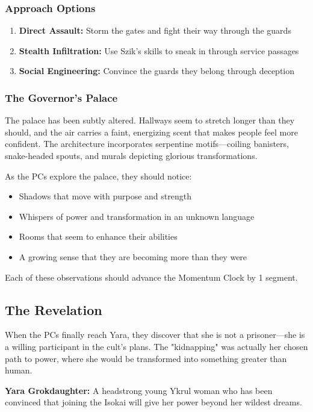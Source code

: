 \documentclass[12pt,twoside]{article}
\begin{document}
\subsubsection{Approach Options}

\begin{enumerate}
  \item \textbf{Direct Assault:} Storm the gates and fight their way through the guards
  \item \textbf{Stealth Infiltration:} Use Szik's skills to sneak in through service passages
  \item \textbf{Social Engineering:} Convince the guards they belong through deception
\end{enumerate}

\subsubsection{The Governor's Palace}

The palace has been subtly altered. Hallways seem to stretch longer than they should, and the air carries a faint, energizing scent that makes people feel more confident. The architecture incorporates serpentine motifs—coiling banisters, snake-headed spouts, and murals depicting glorious transformations.

As the PCs explore the palace, they should notice:
\begin{itemize}
  \item Shadows that move with purpose and strength
  \item Whispers of power and transformation in an unknown language
  \item Rooms that seem to enhance their abilities
  \item A growing sense that they are becoming more than they were
\end{itemize}
Each of these observations should advance the Momentum Clock by 1 segment.

\subsection{The Revelation}

When the PCs finally reach Yara, they discover that she is not a prisoner—she is a willing participant in the cult's plans. The "kidnapping" was actually her chosen path to power, where she would be transformed into something greater than human.

\textbf{Yara Grokdaughter:}
A headstrong young Ykrul woman who has been convinced that joining the Isokai will give her power beyond her wildest dreams.
\end{document}
